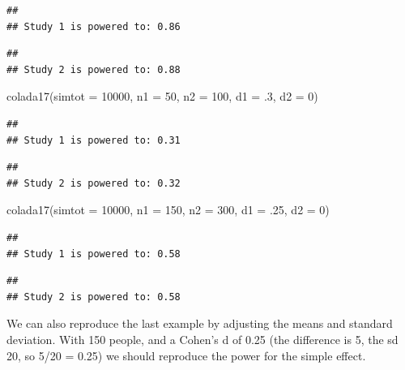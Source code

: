 \documentclass[
]{book}
\newenvironment{Shaded}{\begin{snugshade}}{\end{snugshade}}
\newcommand{\AttributeTok}[1]{\textcolor[rgb]{0.77,0.63,0.00}{#1}}
\newcommand{\DecValTok}[1]{\textcolor[rgb]{0.00,0.00,0.81}{#1}}
\newcommand{\FunctionTok}[1]{\textcolor[rgb]{0.00,0.00,0.00}{#1}}
\newcommand{\NormalTok}[1]{#1}
\begin{document}
\begin{verbatim}
## 
## Study 1 is powered to: 0.86
\end{verbatim}

\begin{verbatim}
## 
## Study 2 is powered to: 0.88
\end{verbatim}

\begin{Shaded}
\begin{Highlighting}[]
\FunctionTok{colada17}\NormalTok{(}\AttributeTok{simtot =} \DecValTok{10000}\NormalTok{, }\AttributeTok{n1 =} \DecValTok{50}\NormalTok{, }\AttributeTok{n2 =} \DecValTok{100}\NormalTok{, }\AttributeTok{d1 =}\NormalTok{ .}\DecValTok{3}\NormalTok{, }\AttributeTok{d2 =} \DecValTok{0}\NormalTok{)}
\end{Highlighting}
\end{Shaded}

\begin{verbatim}
## 
## Study 1 is powered to: 0.31
\end{verbatim}

\begin{verbatim}
## 
## Study 2 is powered to: 0.32
\end{verbatim}

\begin{Shaded}
\begin{Highlighting}[]
\FunctionTok{colada17}\NormalTok{(}\AttributeTok{simtot =} \DecValTok{10000}\NormalTok{, }\AttributeTok{n1 =} \DecValTok{150}\NormalTok{, }\AttributeTok{n2 =} \DecValTok{300}\NormalTok{, }\AttributeTok{d1 =}\NormalTok{ .}\DecValTok{25}\NormalTok{, }\AttributeTok{d2 =} \DecValTok{0}\NormalTok{)}
\end{Highlighting}
\end{Shaded}

\begin{verbatim}
## 
## Study 1 is powered to: 0.58
\end{verbatim}

\begin{verbatim}
## 
## Study 2 is powered to: 0.58
\end{verbatim}

We can also reproduce the last example by adjusting the means and standard deviation. With 150 people, and a Cohen's d of 0.25 (the difference is 5, the sd 20, so 5/20 = 0.25) we should reproduce the power for the simple effect.
\end{document}
